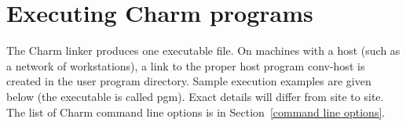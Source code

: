%
%
%
%
%
%
%
%

\section[Executing Charm Programs]{Executing Charm programs}
\label{executing charm programs}

The Charm linker produces one executable file.  On machines with a host
(such as a network of workstations), a link to the proper host program
{\fexec conv-host} is created in the user program directory.  Sample
execution examples are given below (the executable is called {\fparm
pgm}). Exact details will differ from site to site.  The list of Charm
command line options is in Section~\ref{command line options}.

